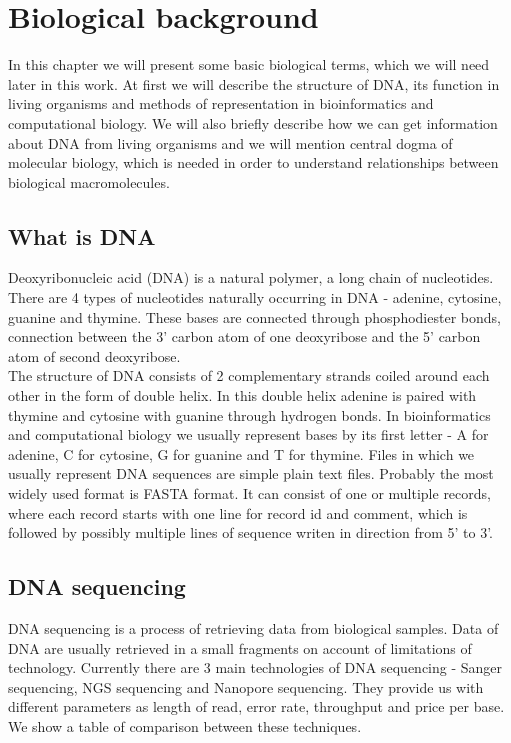 \chapter{Biological background}
In this chapter we will present some basic biological terms, which we will need later in this work.
At first we will describe the structure of DNA, its function in living organisms
and methods of representation in bioinformatics and computational biology.
We will also briefly describe how we can get information about DNA from living organisms and we will mention central dogma of molecular biology, which is needed in order to understand relationships between biological macromolecules.

\section{What is DNA}
Deoxyribonucleic acid (DNA) is a natural polymer, a long chain of nucleotides. There are 4 types of nucleotides
naturally occurring in DNA - adenine, cytosine, guanine and thymine. These bases are connected through phosphodiester bonds,
connection between the 3' carbon atom of one deoxyribose and the 5' carbon atom of second deoxyribose. \\
The structure of DNA consists of 2 complementary strands coiled around each other in the form of double helix.
In this double helix adenine is paired with thymine and cytosine with guanine through hydrogen bonds.
In bioinformatics and computational biology we usually represent bases by its first letter - A for adenine, C for cytosine, G for guanine and T for thymine.
Files in which we usually represent DNA sequences are simple plain text files. Probably the most widely used format is FASTA format.
It can consist of one or multiple records, where each record starts with one line for record id and comment, which is followed by possibly multiple lines of sequence writen in direction from 5' to 3'.

\section{DNA sequencing}
DNA sequencing is a process of retrieving data from biological samples.
Data of DNA are usually retrieved in a small fragments on account of limitations of technology.
Currently there are 3 main technologies of DNA sequencing - Sanger sequencing, NGS sequencing and Nanopore sequencing.
They provide us with different parameters as length of read, error rate, throughput and price per base.
We show a table of comparison between these techniques.

